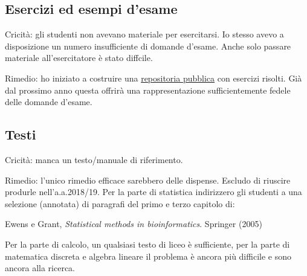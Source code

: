 \documentclass[10pt]{article}
\begin{document}
\subsection{Esercizi ed esempi d'esame}

Cricità: gli studenti non avevano materiale per esercitarsi. Io stesso avevo a disposizione un numero insufficiente di domande d'esame. Anche solo passare materiale all'esercitatore è stato diffcile.

Rimedio: ho iniziato a costruire una \href{https://github.com/domenicozambella/teaching/tree/master/Statistica}{repositoria pubblica\/} con esercizi risolti. Già dal prossimo anno questa offrirà una rappresentazione sufficientemente fedele delle domande d'esame. 


\subsection{Testi}

Cricità: manca un testo/manuale di riferimento.

Rimedio: l'unico rimedio efficace sarebbero delle dispense. Escludo di riuscire produrle nell'a.a.2018/19. Per la parte di statistica indirizzero gli studenti a una selezione (annotata) di paragrafi del primo e terzo capitolo di:

Ewens e Grant, \textit{Statistical methods in bioinformatics}. Springer (2005)

Per la parte di calcolo, un qualsiasi testo di liceo è sufficiente, per la parte di matematica discreta e algebra lineare il problema è ancora più difficile e sono ancora alla ricerca. 
\end{document}
